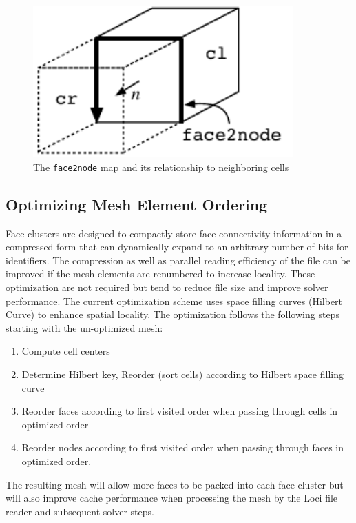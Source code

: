 \documentclass{article}
\begin{document}
\begin{figure}[htbp]
\begin{center}
  \includegraphics[width=10cm]{face}
 \caption{The {\tt face2node} map and its relationship to neighboring cells}
 \label{fig:face}
\end{center}
\end{figure}

\subsection{Optimizing Mesh Element Ordering}

Face clusters are designed to compactly store face connectivity
information in a compressed form that can dynamically expand to an
arbitrary number of bits for identifiers.  The compression as well as
parallel reading efficiency of the file can be improved if the mesh
elements are renumbered to increase locality.  These optimization
are not required but tend to reduce file size and improve solver
performance.  The current optimization scheme uses space filling
curves (Hilbert Curve) to enhance spatial locality.  The optimization
follows the following steps starting with the un-optimized mesh:

\begin{enumerate}
  \item Compute cell centers
  \item Determine Hilbert key, Reorder (sort cells) according to
    Hilbert space filling curve
  \item Reorder faces according to first visited order when passing
    through cells in optimized order
  \item Reorder nodes according to first visited order when passing through
    faces in optimized order.
\end{enumerate}

The resulting mesh will allow more faces to be packed into each face
cluster but will also improve cache performance when processing the
mesh by the Loci file reader and subsequent solver steps.
\end{document}
